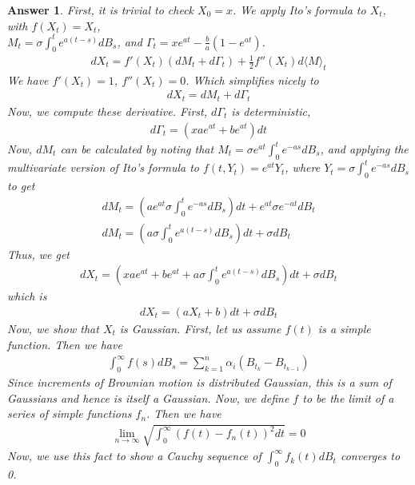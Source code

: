 \documentclass[12pt]{article}
\theoremstyle{colon}
\newtheorem*{answer}{Answer}
\begin{document}
\begin{answer}
  First, it is trivial to check $X_0 = x$. We apply Ito's formula to $X_t$, with $f(X_t) = X_t$, \\ $M_t = \sigma \int_0^t e^{a(t-s)} d B_s$, and $\Gamma_t = x e^{at} - \frac{b}{a} (1 - e^{at})$.
  \begin{gather*}
    d X_t = f'(X_t) (d M_t + d \Gamma_t) + \frac{1}{2} f''(X_t) d \langle M \rangle_t
  \end{gather*}
  We have $f'(X_t) = 1$, $f''(X_t) = 0$. Which simplifies nicely to
  \begin{gather*}
    d X_t = d M_t + d \Gamma_t
  \end{gather*}
  Now, we compute these derivative. First, $d \Gamma_t$ is deterministic,
  \begin{gather*}
    d \Gamma_t = (x a e^{at} + be^{at}) dt
  \end{gather*}
  Now, $d M_t$ can be calculated by noting that $M_t = \sigma e^{at} \int_0^t e^{-as} d B_s$, and applying the multivariate version of Ito's formula to $f(t, Y_t) = e^{at} Y_t$, where $Y_t = \sigma \int_0^t e^{-as} d B_s$ to get
  \begin{gather*}
    d M_t = (a e^{at} \sigma \int_0^t e^{-as} d B_s )dt + e^{at} \sigma e^{-at} d B_t \\
    d M_t = (a \sigma \int_0^t e^{a(t-s)} d B_s )dt + \sigma d B_t
  \end{gather*}
  Thus, we get
  \begin{gather*}
    d X_t = (x a e^{at} + be^{at} + a \sigma \int_0^t e^{a(t-s)} d B_s) dt + \sigma d B_t
  \end{gather*}
  which is
  \begin{gather*}
    d X_t = (a X_t + b) dt + \sigma d B_t
  \end{gather*}
  Now, we show that $X_t$ is Gaussian. First, let us assume $f(t)$ is a simple function. Then we have
  \begin{gather*}
    \int_0^\infty f(s) d B_s = \sum_{k = 1}^n \alpha_i (B_{t_k} - B_{t_{k-1}})
  \end{gather*}
  Since increments of Brownian motion is distributed Gaussian, this is a sum of Gaussians and hence is itself a Gaussian. Now, we define $f$ to be the limit of a series of simple functions $f_n$. Then we have
  \begin{gather*}
    \lim_{n \rightarrow \infty} \sqrt{\int_0^\infty (f(t) - f_n(t))^2 dt} = 0
  \end{gather*}
  Now, we use this fact to show a Cauchy sequence of $\int_0^\infty f_k(t) d B_t$ converges to 0.

\end{answer}
\end{document}
